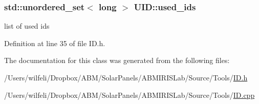 \hypertarget{classsolar__core_1_1_u_i_d_a8328b1b39052cead4c79ff8bdc55da70}{}
\subsubsection[{used\+\_\+ids}]{\setlength{\rightskip}{0pt plus 5cm}std\+::unordered\+\_\+set$<$ long $>$ U\+I\+D\+::used\+\_\+ids\hspace{0.3cm}{\ttfamily [static]}}\label{classsolar__core_1_1_u_i_d_a8328b1b39052cead4c79ff8bdc55da70}
list of used ids 

Definition at line 35 of file I\+D.\+h.



The documentation for this class was generated from the following files\+:\begin{DoxyCompactItemize}
\item 
/\+Users/wilfeli/\+Dropbox/\+A\+B\+M/\+Solar\+Panels/\+A\+B\+M\+I\+R\+I\+S\+Lab/\+Source/\+Tools/\hyperlink{_i_d_8h}{I\+D.\+h}\item 
/\+Users/wilfeli/\+Dropbox/\+A\+B\+M/\+Solar\+Panels/\+A\+B\+M\+I\+R\+I\+S\+Lab/\+Source/\+Tools/\hyperlink{_i_d_8cpp}{I\+D.\+cpp}\end{DoxyCompactItemize}
